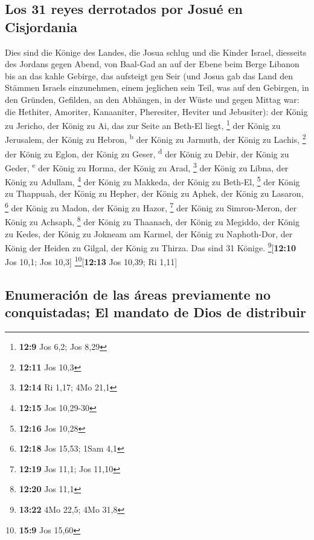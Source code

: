 \hypertarget{los-31-reyes-derrotados-por-josuuxe9-en-cisjordania}{%
\subsection{Los 31 reyes derrotados por Josué en
Cisjordania}\label{los-31-reyes-derrotados-por-josuuxe9-en-cisjordania}}

 Dies sind die Könige des Landes, die Josua schlug und die
Kinder Israel, diesseits des Jordans gegen Abend, von Baal-Gad an auf
der Ebene beim Berge Libanon bis an das kahle Gebirge, das aufsteigt gen
Seir (und Josua gab das Land den Stämmen Israels einzunehmen, einem
jeglichen sein Teil,  was auf den Gebirgen, in den
Gründen, Gefilden, an den Abhängen, in der Wüste und gegen Mittag war:
die Hethiter, Amoriter, Kanaaniter, Pheresiter, Heviter und Jebusiter):
 der König zu Jericho, der König zu Ai, das zur Seite an
Beth-El liegt, \footnote{\textbf{12:9} Jos 6,2; Jos 8,29}
 der König zu Jerusalem, der König zu Hebron,
\textsuperscript{b}  der König zu Jarmuth, der König zu
Lachis, \footnote{\textbf{12:11} Jos 10,3}  der König zu
Eglon, der König zu Geser, \textsuperscript{d}  der König
zu Debir, der König zu Geder, \textsuperscript{e}  der
König zu Horma, der König zu Arad, \footnote{\textbf{12:14} Ri 1,17; 4Mo
  21,1}  der König zu Libna, der König zu Adullam,
\footnote{\textbf{12:15} Jos 10,29-30}  der König zu
Makkeda, der König zu Beth-El, \footnote{\textbf{12:16} Jos 10,28}
 der König zu Thappuah, der König zu Hepher,
 der König zu Aphek, der König zu Lasaron, \footnote{\textbf{12:18}
  Jos 15,53; 1Sam 4,1}  der König zu Madon, der König zu
Hazor, \footnote{\textbf{12:19} Jos 11,1; Jos 11,10}  der
König zu Simron-Meron, der König zu Achsaph, \footnote{\textbf{12:20}
  Jos 11,1}  der König zu Thaanach, der König zu Megiddo,
 der König zu Kedes, der König zu Jokneam am Karmel,
 der König zu Naphoth-Dor, der König der Heiden zu
Gilgal,  der König zu Thirza. Das sind 31 Könige.
\footnote{\textbf{13:22} 4Mo 22,5; 4Mo 31,8}{[}\textbf{12:10} Jos 10,1;
Jos 10,3{]} \footnote{\textbf{15:9} Jos 15,60}{[}\textbf{12:13} Jos
10,39; Ri 1,11{]}

\hypertarget{enumeraciuxf3n-de-las-uxe1reas-previamente-no-conquistadas-el-mandato-de-dios-de-distribuir}{%
\subsection{Enumeración de las áreas previamente no conquistadas; El
mandato de Dios de
distribuir}\label{enumeraciuxf3n-de-las-uxe1reas-previamente-no-conquistadas-el-mandato-de-dios-de-distribuir}}


